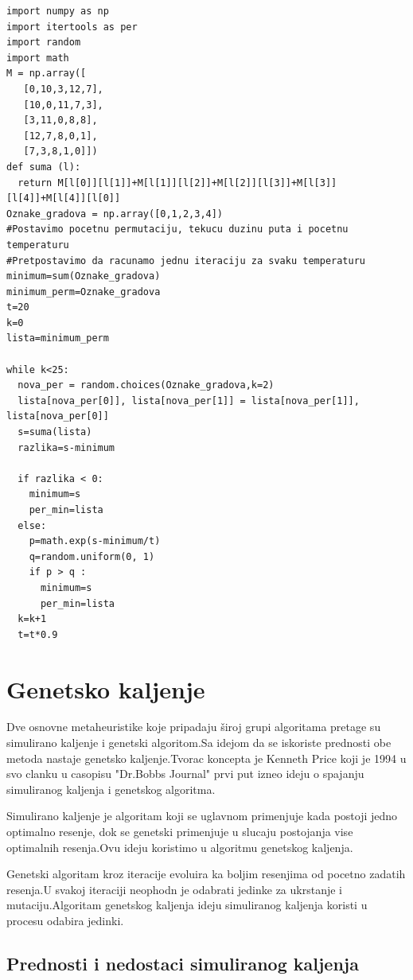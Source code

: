 \documentclass[a4paper]{article}
\begin{document}
\begin{lstlisting}[caption={Resavanje problema TSP koriscenjem SA algoritma},frame=single, label=simple]
import numpy as np
import itertools as per
import random
import math 
M = np.array([
   [0,10,3,12,7],
   [10,0,11,7,3],
   [3,11,0,8,8],
   [12,7,8,0,1],
   [7,3,8,1,0]])
def suma (l):
  return M[l[0]][l[1]]+M[l[1]][l[2]]+M[l[2]][l[3]]+M[l[3]][l[4]]+M[l[4]][l[0]]
Oznake_gradova = np.array([0,1,2,3,4])
#Postavimo pocetnu permutaciju, tekucu duzinu puta i pocetnu temperaturu
#Pretpostavimo da racunamo jednu iteraciju za svaku temperaturu
minimum=sum(Oznake_gradova)
minimum_perm=Oznake_gradova
t=20
k=0
lista=minimum_perm

while k<25:
  nova_per = random.choices(Oznake_gradova,k=2)
  lista[nova_per[0]], lista[nova_per[1]] = lista[nova_per[1]], lista[nova_per[0]]
  s=suma(lista)
  razlika=s-minimum
  
  if razlika < 0:
    minimum=s
    per_min=lista
  else:
    p=math.exp(s-minimum/t)
    q=random.uniform(0, 1)
    if p > q :
      minimum=s
      per_min=lista
  k=k+1
  t=t*0.9
\end{lstlisting}






\section{Genetsko kaljenje}
Dve osnovne metaheuristike koje pripadaju široj grupi algoritama pretage su simulirano kaljenje i genetski algoritom.Sa idejom da se iskoriste prednosti obe metoda nastaje genetsko kaljenje.Tvorac koncepta je Kenneth Price koji je 1994 u svo clanku u casopisu "Dr.Bobbs Journal" prvi put izneo ideju o spajanju simuliranog kaljenja i genetskog algoritma. \par
Simulirano kaljenje je algoritam koji se uglavnom primenjuje kada postoji jedno optimalno resenje, dok se genetski primenjuje u slucaju postojanja vise optimalnih resenja.Ovu ideju koristimo u algoritmu genetskog kaljenja. \par
Genetski algoritam kroz iteracije evoluira ka boljim resenjima od pocetno zadatih resenja.U svakoj iteraciji neophodn je odabrati jedinke za ukrstanje i mutaciju.Algoritam genetskog kaljenja ideju simuliranog kaljenja koristi u procesu odabira jedinki.


\subsection{Prednosti i nedostaci simuliranog kaljenja}
\end{document}

